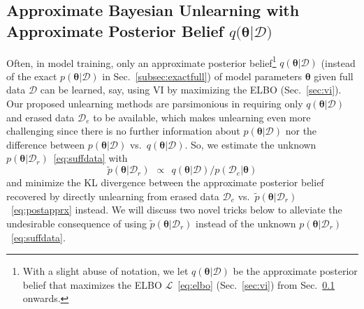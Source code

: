 \documentclass{article}
\theoremstyle{definition}
\newcommand{\mcl}[1]{\mathcal{#1}}
\newcommand{\da}{\mcl{D}}
\newcommand{\dc}{\mcl{D}_r}
\newcommand{\dr}{\mcl{D}_e}
\begin{document}
\subsection{Approximate Bayesian Unlearning with Approximate Posterior Belief
$q($\texorpdfstring{$\bm{\theta}$}{theta}$|\da)$}
\label{subsec:apprfull}
%
Often, in model training, only an approximate posterior belief\footnote{With a slight abuse of notation, we let  $q(\bm{\theta}|\da)$
be the approximate posterior belief that maximizes the ELBO $\mcl{L}$~\eqref{eq:elbo} (Sec.~\ref{sec:vi}) from Sec.~\ref{subsec:apprfull} onwards.} $q(\bm{\theta}|\da)$ (instead of the exact $p(\bm{\theta}|\da)$ in Sec.~\ref{subsec:exactfull}) of model parameters $\bm{\theta}$ given full data $\da$ can be learned, say, using 
VI by maximizing the ELBO (Sec.~\ref{sec:vi}).
Our proposed unlearning methods are parsimonious in requiring only $q(\bm{\theta}|\da)$ and erased data $\dr$ to be available,
which makes unlearning even more challenging since there is no further 
information about $p(\bm{\theta}|\da)$ nor the difference between $p(\bm{\theta}|\da)$ vs.~$q(\bm{\theta}|\da)$. 
%
So, we estimate the unknown $p(\bm{\theta}|\dc)$~\eqref{eq:suffdata} with
%
\begin{equation}
\tilde{p}(\bm{\theta}|\dc)\ \  \propto\ \ {q(\bm{\theta}|\da)}/{p(\dr| \bm{\theta})}
\label{eq:postapprx}
\end{equation}
%
and minimize the KL divergence between the approximate posterior belief recovered by directly unlearning from erased data $\dr$
vs.~$\tilde{p}(\bm{\theta}|\dc)$~\eqref{eq:postapprx} instead. We will discuss  two novel tricks below to alleviate the undesirable consequence of using $\tilde{p}(\bm{\theta}|\dc)$ instead of the unknown $p(\bm{\theta}|\dc)$~\eqref{eq:suffdata}.
%
\end{document}
